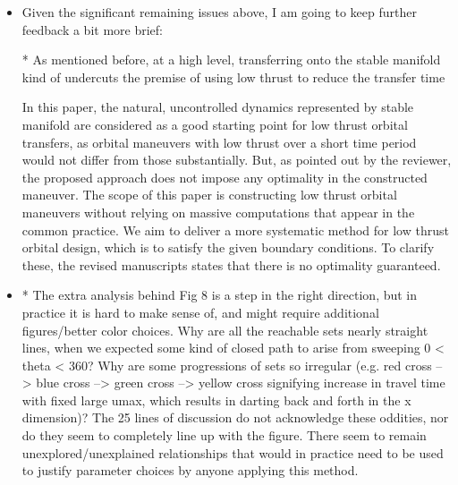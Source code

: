 \documentclass[11pt]{article}
\begin{document}
\begin{itemize}
    \item
        \begin{itshape}

            Given the significant remaining issues above, I am going to keep further
            feedback a bit more brief:

            * As mentioned before, at a high level, transferring onto the stable
            manifold kind of undercuts the premise of using low thrust to reduce the
            transfer time
        \end{itshape}

        In this paper, the natural, uncontrolled dynamics represented by stable manifold are considered as a good starting point for low thrust orbital transfers, as orbital maneuvers with low thrust over a short time period would not differ from those substantially. 
        But, as pointed out by the reviewer, the proposed approach does not impose any optimality in the constructed maneuver. 
        The scope of this paper is constructing low thrust orbital maneuvers without relying on massive computations that appear in the common practice. 
        We aim to deliver a more systematic method for low thrust orbital design, which is to satisfy the given boundary conditions. 
        To clarify these, the revised manuscripts states that there is no optimality guaranteed.

    \item
        \begin{itshape}

            * The extra analysis behind Fig 8 is a step in the right direction, but in
            practice it is hard to make sense of, and might require additional
            figures/better color choices.  Why are all the reachable sets nearly
            straight lines, when we expected some kind of closed path to arise from
            sweeping 0 < theta < 360?  Why are some progressions of sets so irregular
            (e.g. red cross --> blue cross --> green cross --> yellow cross signifying
            increase in travel time with fixed large umax, which results in darting
            back and forth in the x dimension)?  The 25 lines of discussion do not
            acknowledge these oddities, nor do they seem to completely line up with the
            figure.  There seem to remain unexplored/unexplained relationships that
            would in practice need to be used to justify parameter choices by anyone
            applying this method.   
        \end{itshape}
        

\end{itemize}
\end{document}
